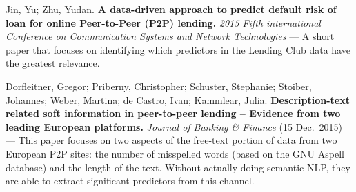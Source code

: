 Jin, Yu; Zhu, Yudan.
{\bf A data-driven approach to predict default risk of loan for online Peer-to-Peer (P2P) lending.}
{\it 2015 Fifth international Conference on Communication Systems and Network Technologies}
---
A short paper that focuses on identifying which predictors in the Lending Club data have the greatest relevance.

Dorfleitner, Gregor; Priberny, Christopher; Schuster, Stephanie; Stoiber, Johannes; Weber,  Martina; de Castro, Ivan; Kammlear, Julia.
{\bf Description-text related soft information in peer-to-peer lending – Evidence from two leading European platforms.}
{\it Journal of Banking \& Finance} (15 Dec.~2015)
---
This paper focuses on two aspects of the free-text portion of data from two European P2P sites: the number of misspelled words (based on the GNU Aspell database) and the length of the text. Without actually doing semantic NLP, they are able to extract significant predictors from this channel.

\bye
